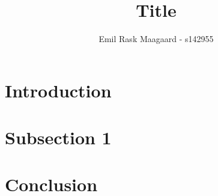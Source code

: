 \documentclass{dtu_report_short}
\title{Title}
\author{Emil Rask Maagaard - s142955}
\begin{document}
\maketitle{}
\titlepage


\section*{Introduction}



\newpage
\section*{Subsection 1}



\newpage
\section*{Conclusion}

\end{document}
